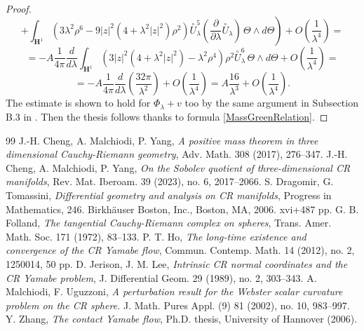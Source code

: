 \documentclass[10pt,a4paper]{amsart}
\newcommand{\de}{\partial}
\renewcommand{\H}{\mathbf{H}}
\renewcommand{\l}{\lambda }
\begin{document}
\begin{proof}
 $$\left.+ \int_{\H^1}\left(3\lambda^2\rho^6 -9|z|^2 (4 + \lambda^2 |z|^2) \rho^2\right) \overset{\circ}{U}_\lambda^5\left(\frac{\de}{\de\lambda}\overset{\circ}{U}_{\lambda} \right) \, \Theta\wedge d\Theta\right) +O\left(\frac{1}{\lambda^4}\right)=$$
 $$=-A\frac{1}{4\pi}\frac{d}{d\lambda}\int_{\H^1} \left( 3 |z|^2 (4 + \l^2 |z|^2) - \l^2 \rho^4 \right) \rho^2 \overset{\circ}{U}_\l^6 \, \Theta\wedge d\Theta +O\left(\frac{1}{\lambda^4}\right)=$$
 $$=-A\frac{1}{4\pi}\frac{d}{d\lambda}\left(\frac{32\pi}{\lambda^2}\right) +O\left(\frac{1}{\lambda^4}\right) = A\frac{16}{\lambda^3} +O\left(\frac{1}{\lambda^4}\right).$$
 The estimate is shown to hold for $\Phi_{\lambda}+v$ too by the same argument in Subsection B.3 in \cite{CMY2}. Then the thesis follows thanks to formula \eqref{MassGreenRelation}.
\end{proof}


\begin{thebibliography}{99}
 J.-H. Cheng, A. Malchiodi, P. Yang, \textit{A positive mass theorem in three dimensional Cauchy-Riemann geometry}, Adv. Math. 308 (2017), 276–347.
 J.-H. Cheng, A. Malchiodi, P. Yang, \textit{On the Sobolev quotient of three-dimensional CR manifolds}, Rev. Mat. Iberoam. 39 (2023), no. 6, 2017–2066.
 S. Dragomir, G. Tomassini, \textit{Differential geometry and analysis on CR manifolds}, Progress in Mathematics, 246. Birkhäuser Boston, Inc., Boston, MA, 2006. xvi+487 pp.
 G. B. Folland, \textit{The tangential Cauchy-Riemann complex on spheres}, Trans. Amer. Math. Soc. 171 (1972), 83–133.
 P. T. Ho, \textit{The long-time existence and convergence of the CR Yamabe flow}, Commun. Contemp. Math. 14 (2012), no. 2, 1250014, 50 pp.
 D. Jerison, J. M. Lee, \textit{Intrinsic CR normal coordinates and the CR Yamabe problem}, J. Differential Geom. 29 (1989), no. 2, 303–343.
 A. Malchiodi, F. Uguzzoni, \textit{A perturbation result for the Webster scalar curvature problem on the CR sphere.} J. Math. Pures Appl. (9) 81 (2002), no. 10, 983–997.
 Y. Zhang, \textit{The contact Yamabe ﬂow}, Ph.D. thesis, University of Hannover (2006).
\end{thebibliography}
\end{document}
